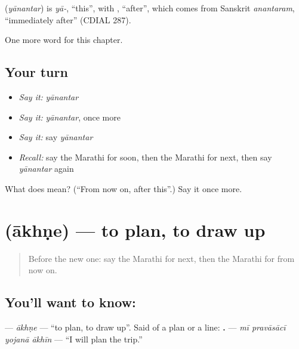 \begin{cousinweb}
\textbf{} (\emph{yānantar}) is \emph{yā-}, \textquotedblleft{}this\textquotedblright{}, with \textbf{}, \textquotedblleft{}after\textquotedblright{}, which comes from Sanskrit \emph{anantaram}, \textquotedblleft{}immediately after\textquotedblright{} (CDIAL 287).
\end{cousinweb}

\begin{grammarlens}[title={What you've built}]
One more word for this chapter.
\end{grammarlens}

\subsection*{Your turn}
\begin{itemize}
\raggedright
  \item \emph{Say it:} \emph{yānantar}
  \item \emph{Say it:} \emph{yānantar}, once more
  \item \emph{Say it:} say \emph{yānantar}
  \item \emph{Recall:} say the Marathi for soon, then the Marathi for next, then say \emph{yānantar} again
\end{itemize}

\begin{tcolorbox}[breakable,colback=teal!4,colframe=teal!35!black,title={Before you move on}]
What does  mean? (\textquotedblleft{}From now on, after this\textquotedblright{}.) Say it once more.
\end{tcolorbox}
\section[\texorpdfstring{\mr{आखणे} (ākhṇe)}{आखणे (ākhṇe)}]{ (ākhṇe) — to plan, to draw up}

\label{lesson:MR-C160-akhne}



\begin{quote}
Before the new one: say the Marathi for next, then the Marathi for from now on.
\end{quote}

\subsection*{You'll want to know: }
\textbf{} — \emph{ākhṇe} — \textquotedblleft{}to plan, to draw up\textquotedblright{}. Said of a plan or a line: \textbf{   .} — \emph{mī pravāsācī yojanā ākhīn} — \textquotedblleft{}I will plan the trip.\textquotedblright{}

